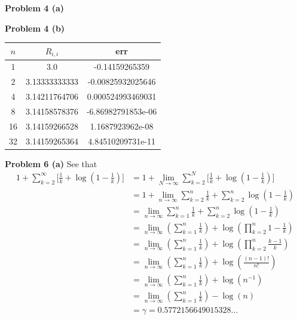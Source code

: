 \documentclass[12pt]{article}
\newcommand{\problem}[1]{\hspace{-4 ex} \large \textbf{Problem #1} }
\begin{document}
\bigbreak
\problem{4 (a)}

\bigbreak
\problem{4 (b)}

\begin{center}
	\begin{tabular}{|c|c|c|}
		\hline
		$n$&$R_{i,i}$&err\\ \hline
		1&3.0&-0.14159265359\\ \hline
		2&3.13333333333&-0.00825932025646\\ \hline
		4&3.14211764706&0.000524993469031\\ \hline
		8&3.14158578376&-6.86982791853e-06\\ \hline
		16&3.14159266528&1.1687923962e-08\\ \hline
		32&3.14159265364&4.84510209731e-11\\ \hline
	\end{tabular}
\end{center}

	
\bigbreak
\problem{6 (a)} See that
\begin{align*}
	1 + \sum_{k=2}^\infty \Big [ \tfrac{1}{k} + \log(1-\tfrac{1}{k}) \Big] & = 1 + \lim_{N \to \infty} \sum_{k=2}^N \Big [ \tfrac{1}{k} + \log(1-\tfrac{1}{k}) \Big] \\
	& = 1 + \lim_{n \to \infty} \sum_{k=2}^n \tfrac{1}{k} + \sum_{k=2}^n \log(1-\tfrac{1}{k}) \\
	& = \lim_{n \to \infty} \sum_{k=1}^n \tfrac{1}{k} + \sum_{k=2}^n \log(1-\tfrac{1}{k}) \\
	& = \lim_{n \to \infty} \left( \sum_{k=1}^n \tfrac{1}{k} \right) + \log \left( \prod_{k=2}^n 1-\tfrac{1}{k} \right) \\
	& = \lim_{n \to \infty} \left( \sum_{k=1}^n \tfrac{1}{k} \right) + \log \left( \prod_{k=2}^n \tfrac{k-1}{k} \right) \\
	& = \lim_{n \to \infty} \left( \sum_{k=1}^n \tfrac{1}{k} \right) + \log \left( \frac{(n-1)!}{n!} \right) \\
	& = \lim_{n \to \infty} \left( \sum_{k=1}^n \tfrac{1}{k} \right) + \log \left( n^{-1} \right) \\
	& = \lim_{n \to \infty} \left( \sum_{k=1}^n \tfrac{1}{k} \right) - \log \left( n \right) \\
	& = \gamma = 0.5772156649015328\dots
\end{align*}
\end{document}
